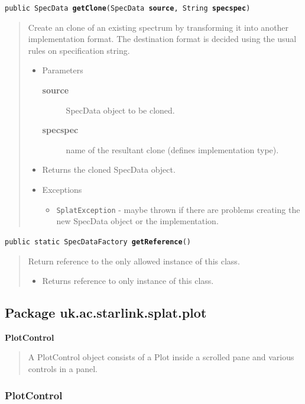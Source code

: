 \documentclass[twoside,11pt]{article}
\newcommand{\htmlref}[2]{#1}
\renewcommand{\_}{\texttt{\symbol{95}}}
\newcommand{\entityintro}[3]{
  \htmlref{\textbf{\Large{#1}}}{#2}
  \dotfill\pageref{#2}
  \begin{quote}
  #3
  \end{quote}
}
\newcommand{\startsection}[4]{
   \subsubsection{\label{#3}{#2}}
   #4
}
\newcommand{\method}[1]{\texttt{#1}}
\newenvironment{desc}{\begin{quote}}{\end{quote}}
\begin{document}
\method{public SpecData
\textbf{getClone}(\texttt{SpecData}
        \textbf{source},
        \texttt{String} \textbf{specspec})\label{l125}\label{l126}}
\begin{desc}Create an clone of an existing spectrum by transforming it into
 another implementation format. The destination format is
 decided using the usual rules on specification string.
\begin{itemize}
\item{Parameters
  \begin{description}
   \item[\textbf{source}]{SpecData object to be cloned.}
   \item[\textbf{specspec}]{name of the resultant clone (defines
                 implementation type).}
  \end{description}}
\end{itemize}
\begin{itemize}
\item{Returns the cloned SpecData object. }
\item{{Exceptions}
  \begin{itemize}
   \item{\vspace{-.6ex}\texttt{SplatException} - maybe thrown if there are problems
            creating the new SpecData object or the implementation.}
  \end{itemize}
}
\end{itemize}
\end{desc}

\method{public static SpecDataFactory \textbf{getReference}()\label{l127}\label{l128}}
\begin{desc}Return reference to the only allowed instance of this class.
\begin{itemize}
\item{Returns reference to only instance of this class. }
\end{itemize}
\end{desc}

\clearpage


\subsection{Package uk.ac.starlink.splat.plot}

\entityintro{PlotControl}{l129}{A PlotControl object consists of a Plot inside a scrolled pane and
 various controls in a panel.}
\clearpage
\startsection{Class}{PlotControl}{l129}
\end{document}
